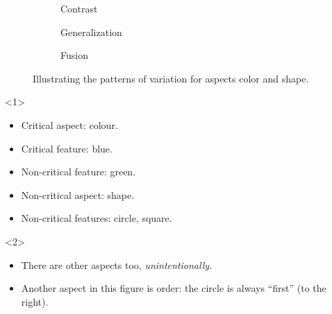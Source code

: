 \begin{frame}
  \begin{figure}
    \begin{subfigure}{0.3\columnwidth}
      \centering
      \caption{Contrast}
    \end{subfigure}
    \hfill
    \begin{subfigure}{0.3\columnwidth}
      \centering
      \caption{Generalization}
    \end{subfigure}
    \hfill
    \begin{subfigure}{0.3\columnwidth}
      \centering
      \caption{Fusion}
    \end{subfigure}
    \caption{%
      Illustrating the patterns of variation for aspects color and shape.
    }
  \end{figure}

  \begin{onlyenv}<1>
    \begin{example}
      \begin{itemize}
        \item Critical aspect: colour.
        \item Critical feature: blue.
        \item Non-critical feature: green.
        \item Non-critical aspect: shape.
        \item Non-critical features: circle, square.
      \end{itemize}
    \end{example}
  \end{onlyenv}
  \begin{onlyenv}<2>
    \begin{remark}
      \begin{itemize}
        \item There are other aspects too, \emph{unintentionally}.
        \item Another aspect in this figure is order: the circle is always 
          \enquote{first} (to the right).
      \end{itemize}
    \end{remark}
  \end{onlyenv}
\end{frame}


